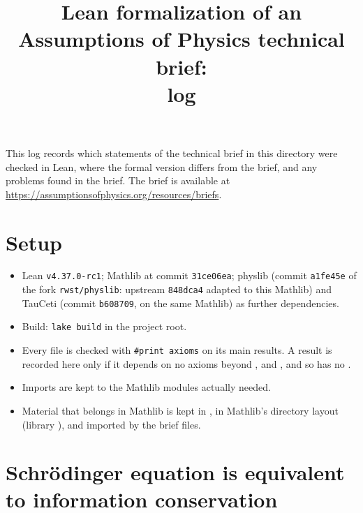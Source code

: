 \documentclass[11pt]{article}
\title{Lean formalization of an Assumptions of Physics technical brief:\\ log}
\author{}
\date{}
\begin{document}
\maketitle

\noindent
This log records which statements of the technical brief in this directory were checked in Lean,
where the formal version differs from the brief, and any problems found in the brief.
The brief is available at \url{https://assumptionsofphysics.org/resources/briefs}.

\section*{Setup}

\begin{itemize}
\item Lean \texttt{v4.37.0-rc1}; Mathlib at commit \texttt{31ce06ea}; physlib (commit \texttt{a1fe45e}
  of the fork \texttt{rwst/physlib}: upstream \texttt{848dca4} adapted to this Mathlib) and
  TauCeti (commit \texttt{b608709}, on the same Mathlib) as further dependencies.
\item Build: \texttt{lake build} in the project root.
\item Every file is checked with \texttt{\#print axioms} on its main results. A result is
  recorded here only if it depends on no axioms beyond ,
   and , and so has no .
\item Imports are kept to the Mathlib modules actually needed.
\item Material that belongs in Mathlib is kept in , in Mathlib's directory
  layout (library ), and imported by the brief files.
\end{itemize}



\section{Schr\"odinger equation is equivalent to information conservation}
\end{document}
